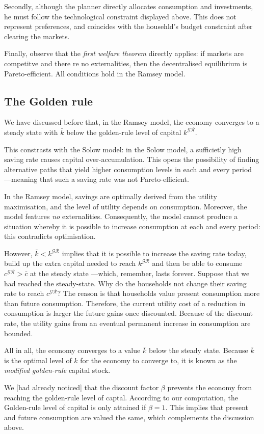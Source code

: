 \documentclass[11pt,a4paper,english]{article}
\begin{document}
Secondly, although the planner directly allocates consumption and
investments, he must follow the technological constraint displayed
above. This does not represent preferences, and coincides with the
househld's budget constraint after clearing the markets.

Finally, observe that the \emph{first welfare theorem} directly applies:
if markets are competitve and there re no externalities, then the
decentralised equilibrium is Pareto-efficient. All conditions hold in
the Ramsey model.

\hypertarget{the-golden-rule}{%
\subsection{The Golden rule}\label{the-golden-rule}}

We have discussed before that, in the Ramsey model, the economy
converges to a steady state with \(\bar{k}\) below the golden-rule level
of capital \(k^{\mathcal{GR}}\).

This constrasts with the Solow model: in the Solow model, a sufficietly
high saving rate causes capital over-accumulation. This opens the
possibility of finding alternative paths that yield higher consumption
levels in each and every period ---meaning that such a saving rate was
not Pareto-efficient.

In the Ramsey model, savings are optimally derived from the utility
maximisation, and the level of utility depends on consumption. Moreover,
the model features \emph{no} externalities. Consequently, the model
cannot produce a situation whereby it is possible to increase
consumption at each and every period: this contradicts optimisation.

However, \(\bar{k} < k^{\mathcal{GR}}\) implies that it is possible to
increase the saving rate today, build up the extra capital needed to
reach \(k^{\mathcal{GR}}\) and then be able to consume
\(c^{\mathcal{GR}} > \bar{c}\) at the steady state ---which, remember,
lasts forever. Suppose that we had reached the steady-state. Why do the
households not change their saving rate to reach \(c^{\mathcal{GR}}?\)
The reason is that households value present consumption more than future
consumption. Therefore, the current utility cost of a reduction in
consumption is larger the future gains once discounted. Because of the
discount rate, the utility gains from an eventual permanent increase in
consumption are bounded.

All in all, the economy converges to a value \(\bar{k}\) below the
steady state. Because \(\bar{k}\) is the optimal level of \(k\) for the
economy to converge to, it is known as the \emph{modified golden-rule}
capital stock.

We {[}had already noticed{]} that the discount factor \(\beta\) prevents
the economy from reaching the golden-rule level of captal. According to
our computation, the Golden-rule level of capital is only attained if
\(\beta = 1.\) This implies that present and future consumption are
valued the same, which complements the discussion above.
\end{document}
